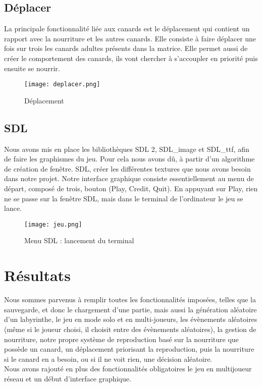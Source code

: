 ﻿\documentclass[12pt,a4paper,twoside]{article}
\begin{document}
\subsection{Déplacer}
La principale fonctionnalité liée aux canards est le déplacement qui contient un rapport avec la nourriture et les autres canards. Elle consiste à faire déplacer une fois sur trois les canards adultes présents dans la matrice. Elle permet aussi de créer le comportement des canards, ils vont chercher à s’accoupler en priorité puis ensuite se nourrir. \\
\begin{figure}[h]
\centering
\texttt{[image: deplacer.png]}
\caption{Déplacement}
\end{figure}
\subsection{SDL}
Nous avons mis en place les bibliothèques SDL 2, SDL\_image et SDL\_ttf, afin de faire les 
graphismes du jeu. Pour cela nous avons dû, à partir d’un algorithme de création de fenêtre.
SDL, créer les différentes textures que nous avons besoin dans notre projet.
Notre interface graphique consiste essentiellement au menu de départ, composé de trois, bouton (Play, Credit, Quit).
En appuyant sur Play, rien ne se passe sur la fenêtre SDL, mais dans le terminal de l’ordinateur le jeu se lance.\\
\begin{figure}[h]
\centering
\texttt{[image: jeu.png]}
\caption{Menu SDL : lancement du terminal}
\end{figure}
\newpage
\section{Résultats}
    Nous sommes parvenus à remplir toutes les fonctionnalités imposées,
telles que la sauvegarde, et donc le chargement d’une partie, mais aussi la
génération aléatoire d'un labyrinthe, le jeu en mode solo et en multi-joueurs,
les évènements aléatoires (même si le joueur choisi, il choisit entre des
évènements aléatoires), la gestion de nourriture, notre propre système de
reproduction basé sur la nourriture que possède un canard, un déplacement priorisant
la reproduction, puis la nourriture si le canard en a besoin, ou si il ne voit rien,
une décision aléatoire.
\\Nous avons rajouté en plus des fonctionnalités obligatoires le jeu en multijoueur réseau et un début d’interface graphique. 
\end{document}

